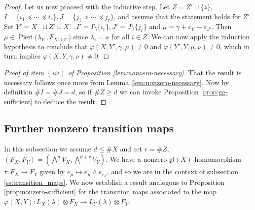 \documentclass[11pt,fleqn]{amsart}
\renewcommand\to{\longrightarrow}
\renewcommand\phi{\varphi}
\renewcommand\epsilon{\varepsilon}
\theoremstyle{definition}
\theoremstyle{remark}
\theoremstyle{remark}
\newcommand\gl{\mathfrak{gl}}
\newcommand\Pieri[2]{\operatorname{Pieri}{(#1},{#2)}}
\newcommand\map[4]{\phi(#3,#4,#1,#2)}
\begin{document}
\begin{proof}
Let us now proceed with the inductive step. Let $Z = Z' \sqcup \{z\}$, $I = 
\{i_1 \preceq \cdots \preceq i_r\}, J = \{j_1 \preceq \cdots \preceq j_r\}$, 
and assume that the statement holds for $Z'$. Set $Y' = X^- \sqcup Z' 
\sqcup X^+, I' = I \setminus 
\{i_r\}, J' = J \setminus \{j_r\}$ and $\mu = \gamma + \epsilon_{I'} - 
\epsilon_{J'}$. Then $\mu \in \Pieri{\lambda_{Y'}}{F_{X \cup Z'}}$ since 
$\lambda_i = a$ for all $i \in Z$. We can now apply the induction hypothesis to 
conclude that 
$\map{\gamma}{\mu}{X}{Y'} \neq 0$ and $\map{\mu}{\nu}{Y'}{Y} \neq 0$, which in 
turn implies $\map{\gamma}{\nu}{X}{Y} \neq 0$.
\end{proof}

\begin{proof}[Proof of item $(iii)$ of Proposition \ref{lem:nonzero-necessary}]
That the result is necessary follows once more from Lemma 
\ref{lem:nonzero-necessary}. Now by definition $\# I = \#J = d$, so if $\# Z 
\geq d$ we can invoke Proposition \ref{prop:gg-sufficient} to deduce the result.
\end{proof}

\subsection{Further nonzero transition maps}
In this subsection we assume $d \leq \#X$ and set $r = \# Z$, $(F_X, F_Y) 
= \left(\bigwedge^d V_X, \bigwedge^{d+r} V_Y \right)$. We have a nonzero 
$\gl(X)$-homomorphism $\tau: F_X \to F_Y$ given by $e_\mu \mapsto e_{\mu} 
\wedge e_{\epsilon_Z}$, and so we are in the context of subsection 
\ref{ss:transition_maps}. We now establish a result analogous to Proposition 
\ref{prop:nonzero-sufficient} for the transition maps associated to the 
map $\phi(X,Y): L_X(\lambda) \otimes F_X \to L_Y(\lambda) \otimes 
F_Y$.
\end{document}
